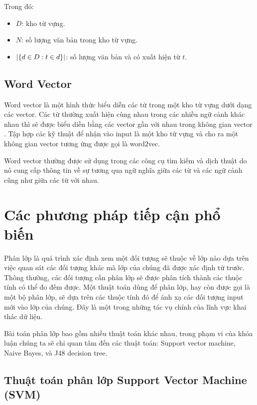 Trong đó:
\begin{itemize}
  \item $D$: kho từ vựng.
  \item $N$: số lượng văn bản trong kho từ vựng.
  \item $\abs{\{d \in D: t \in d \}}$: số lượng văn bản và có xuất hiện từ $t$. 
\end{itemize}
	\subsection*{Word Vector}
Word vector là một hình thức biểu diễn các từ trong một kho từ vựng dưới dạng các vector. Các từ thường xuất hiện cùng nhau trong các nhiều ngữ cảnh khác nhau thì sẽ được biểu diễn bằng các vector gần với nhau trong không gian vector \cite{mikolov:word2vec}. Tập hợp các kỹ thuật để nhận vào input là một kho từ vựng và cho ra một không gian vector tương ứng được gọi là word2vec.

  Word vector thường được sử dụng trong các công cụ tìm kiếm và dịch thuật do nó cung cấp thông tin về sự tương qua ngữ nghĩa giữa các từ và các ngữ cảnh cũng như giữa các từ với nhau.

\section{Các phương pháp tiếp cận phổ biến}
\label{sec:alg}
Phân lớp là quá trình xác định xem một đối tượng sẽ thuộc về lớp nào dựa trên việc quan sát các đối tượng khác mà lớp của chúng đã được xác định từ trước. Thông thường, các đối tượng cần phân lớp sẽ được phân tích thành các thuộc tính có thể đo đếm được. Một thuật toán dùng để phân lớp, hay còn được gọi là một bộ phân lớp, sẽ dựa trên các thuộc tính đó để ánh xạ các đối tượng input mới vào lớp của chúng. Đây là một trong những tác vụ chính của lĩnh vực khai thác dữ liệu.

Bài toán phân lớp bao gồm nhiều thuật toán khác nhau, trong phạm vi của khóa luận chúng ta sẽ chỉ quan tâm đến các thuật toán: Support vector machine, Naive Bayes, và J48 decision tree.
\subsection{Thuật toán phân lớp Support Vector Machine (SVM)}
